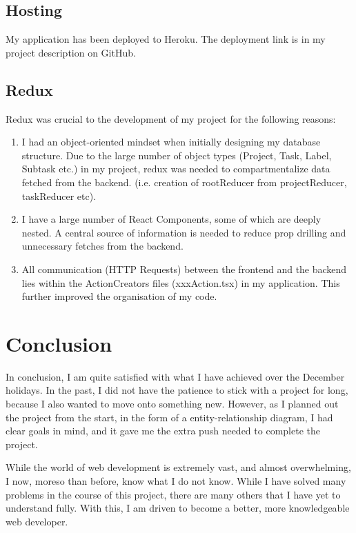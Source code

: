 \documentclass{article}
\begin{document}
\subsection{Hosting}
My application has been deployed to Heroku. The deployment link is in my project description on GitHub.

\subsection{Redux}
Redux was crucial to the development of my project for the following reasons:
\begin{enumerate}
  \item I had an object-oriented mindset when initially designing my database structure. Due to the large number of object types (Project, Task, Label, Subtask etc.) in my project, redux was needed to compartmentalize data fetched from the backend. (i.e. creation of rootReducer from projectReducer, taskReducer etc).
  \item I have a large number of React Components, some of which are deeply nested. A central source of information is needed to reduce prop drilling and unnecessary fetches from the backend.
  \item All communication (HTTP Requests) between the frontend and the backend lies within the ActionCreators files (xxxAction.tsx) in my application. This further improved the organisation of my code. 
\end{enumerate}

\section{Conclusion}
In conclusion, I am quite satisfied with what I have achieved over the December holidays. In the past, I did not have the patience to stick with a project for long, because I also wanted to move onto something new. However, as I planned out the project from the start, in the form of a entity-relationship diagram, I had clear goals in mind, and it gave me the extra push needed to complete the project.

While the world of web development is extremely vast, and almost overwhelming, I now, moreso than before, know what I do not know. While I have solved many problems in the course of this project, there are many others that I have yet to understand fully. With this, I am driven to become a better, more knowledgeable web developer.
\end{document}
